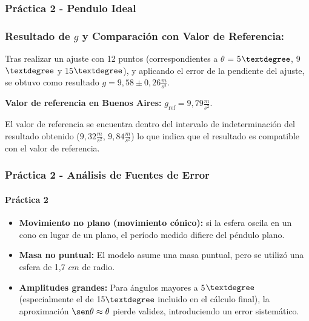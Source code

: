 
\subsubsection{Práctica 2 - Pendulo Ideal}

\subsubsection{Resultado de $g$ y Comparación con Valor de Referencia:}

Tras realizar un ajuste con 12 puntos (correspondientes a $\theta$ = 5$\textdegree$, 9$\textdegree$ y 15$\textdegree$), y aplicando el error de la pendiente del ajuste, se obtuvo como resultado $g = 9{,}58 \pm 0{,}26 \frac{m}{s^2}$.

\textbf{Valor de referencia en Buenos Aires:} $g_{\text{ref}} = 9{,}79 \frac{m}{s^2}$.

El valor de referencia se encuentra dentro del intervalo de indeterminación del resultado obtenido ($9{,}32 \frac{m}{s^2}$, $9{,}84 \frac{m}{s^2}$) lo que indica que el resultado es compatible con el valor de referencia.

\subsubsection{Práctica 2 - Análisis de Fuentes de Error}

\paragraph{Práctica 2}
\begin{itemize}
    \item \textbf{Movimiento no plano (movimiento cónico):} si la esfera oscila en un cono en lugar de un plano, el período medido difiere del péndulo plano.
    \item \textbf{Masa no puntual:} El modelo asume una masa puntual, pero se utilizó una esfera de 1,7 $cm$ de radio.
    \item \textbf{Amplitudes grandes:} Para ángulos mayores a 5$\textdegree$ (especialmente el de 15$\textdegree$ incluido en el cálculo final), la aproximación $\sen \theta \approx \theta$ pierde validez, introduciendo un error sistemático.
\end{itemize}

